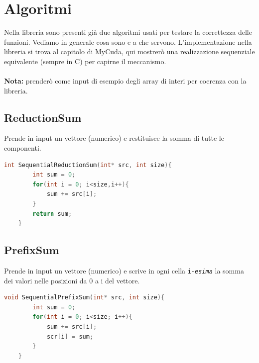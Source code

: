 \documentclass[binding=0.6cm, noexaminfo]{sapthesis}\usepackage{microtype}
\begin{document}
\chapter{Algoritmi}
Nella libreria sono presenti già due algoritmi usati per testare la correttezza delle funzioni.
Vediamo in generale cosa sono e a che servono. L'implementazione nella libreria si trova al capitolo di MyCuda, 
qui mostrerò una realizzazione sequenziale equivalente (sempre in C) per capirne il meccanismo.
\\\\
\textbf{Nota:} prenderò come input di esempio degli array di interi per coerenza con la libreria. 

\section{ReductionSum}
Prende in input un vettore (numerico) e restituisce la somma di tutte le componenti.  
\begin{lstlisting}[language=C]
    int SequentialReductionSum(int* src, int size){
        int sum = 0;
        for(int i = 0; i<size,i++){
            sum += src[i];
        }
        return sum; 
    }
\end{lstlisting}

\section{PrefixSum}
Prende in input un vettore (numerico) e scrive in ogni cella \texttt{i-\textit{esima}} la somma dei valori nelle 
posizioni da 0 a i del vettore.  
\begin{lstlisting}[language=C]
    void SequentialPrefixSum(int* src, int size){
        int sum = 0;
        for(int i = 0; i<size; i++){
            sum += src[i];
            scr[i] = sum; 
        }
    }
\end{lstlisting}
\end{document}
